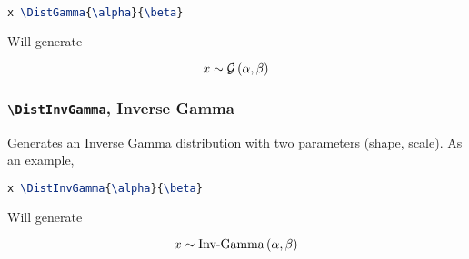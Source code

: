 \documentclass[]{article}
\begin{document}
\begin{lstlisting}[language=TeX]
x \DistGamma{\alpha}{\beta}
\end{lstlisting}

Will generate

\[ x \sim \mathcal{G} \left(\alpha,\beta\right) \]

\subsubsection{\texttt{\textbackslash DistInvGamma}, Inverse Gamma}

Generates an Inverse Gamma distribution with two parameters (shape, scale).
As an example,

\begin{lstlisting}[language=TeX]
x \DistInvGamma{\alpha}{\beta}
\end{lstlisting}

Will generate

\[ x \sim \text{Inv-Gamma} \left(\alpha,\beta\right) \]
\end{document}
